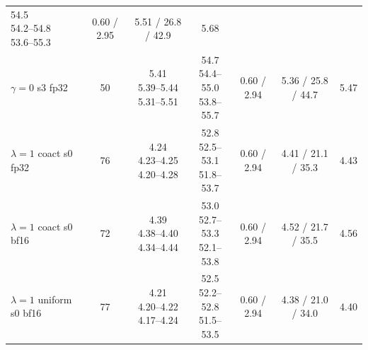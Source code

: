 \documentclass{article}
\begin{document}
\begin{table}[h]
\begin{tabular}{@{}lcccccc@{}}
    \makecell{54.5\\54.2--54.8\\53.6--55.3} & 0.60 / 2.95 & 5.51 / 26.8 / 42.9 &
    5.68 \\
    $\gamma{=}0$ s3 fp32 & 50 & \makecell{5.41\\5.39--5.44\\5.31--5.51} &
    \makecell{54.7\\54.4--55.0\\53.8--55.7} & 0.60 / 2.94 & 5.36 / 25.8 / 44.7 &
    5.47 \\
    $\lambda{=}1$ coact s0 fp32 & 76 & \makecell{4.24\\4.23--4.25\\4.20--4.28} &
    \makecell{52.8\\52.5--53.1\\51.8--53.7} & 0.60 / 2.94 & 4.41 / 21.1 / 35.3 &
    4.43 \\
    $\lambda{=}1$ coact s0 bf16 & 72 & \makecell{4.39\\4.38--4.40\\4.34--4.44} &
    \makecell{53.0\\52.7--53.3\\52.1--53.8} & 0.60 / 2.94 & 4.52 / 21.7 / 35.5 &
    4.56 \\
    $\lambda{=}1$ uniform s0 bf16 & 77 & \makecell{4.21\\4.20--4.22\\4.17--4.24} &
    \makecell{52.5\\52.2--52.8\\51.5--53.5} & 0.60 / 2.94 & 4.38 / 21.0 / 34.0 &
    4.40 \\
    \bottomrule
  \end{tabular}
\end{table}
\end{document}
